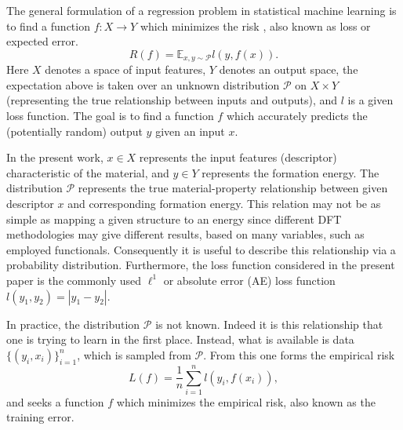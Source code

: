 The general formulation of a regression problem in statistical machine learning is to find a function $f:X\rightarrow Y$ which minimizes the risk \cite{vapnik1999overview}, also known as loss or expected error.
\begin{equation}\label{sipfenn:true_risk_app}
    R(f) = \mathbb{E}_{x,y\sim \mathcal{P}} l(y,f(x)).
\end{equation}
Here $X$ denotes a space of input features, $Y$ denotes an output space, the expectation above is taken over an unknown distribution $\mathcal{P}$ on $X\times Y$ (representing the true relationship between inputs and outputs), and $l$ is a given loss function. The goal is to find a function $f$ which accurately predicts the (potentially random) output $y$ given an input $x$.

In the present work, $x\in X$ represents the input features (descriptor) characteristic of the material, and $y\in Y$ represents the formation energy. The distribution $\mathcal{P}$ represents the true material-property relationship between given descriptor $x$ and corresponding formation energy. This relation may not be as simple as mapping a given structure to an energy since different DFT methodologies may give different results, based on many variables, such as employed functionals. \cite{CharlesW.BauschlicherJr.1995AFunctionals, Alturk2017ComparisonMaterial} Consequently it is useful to describe this relationship via a probability distribution. Furthermore, the loss function considered in the present paper is the commonly used $\ell^1$ or absolute error (AE) loss function $l(y_1,y_2) = |y_1-y_2|$. %

In practice, the distribution $\mathcal{P}$ is not known. Indeed it is this relationship that one is trying to learn in the first place. Instead, what is available is data $\{(y_i,x_i)\}_{i=1}^n$, which is sampled from $\mathcal{P}$. From this one forms the empirical risk \cite{hastie2009elements,vapnik2013nature}
\begin{equation}\label{sipfenn:empirical_risk_app}
    L(f) = \frac{1}{n}\displaystyle\sum_{i=1}^n l(y_i, f(x_i)),
\end{equation}
and seeks a function $f$ which minimizes the empirical risk, also known as the training error.


